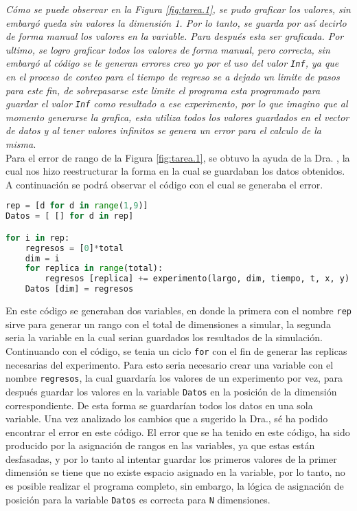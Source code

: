 \documentclass{article}
\begin{document}
\textit{Cómo se puede observar en la Figura \ref{fig:tarea.1}, se pudo graficar los valores, sin embargó queda sin valores la dimensión 1. Por lo tanto, se guarda por así decirlo de forma manual los valores en la variable. Para después esta ser graficada. Por ultimo, se logro graficar todos los valores de forma manual, pero correcta, sin embargó al código se le generan errores creo yo por el uso del valor \texttt{Inf}, ya que en el proceso de conteo para el tiempo de regreso se a dejado un limite de pasos para este fin, de sobrepasarse este limite el programa esta programado para guardar el valor \texttt{Inf} como resultado a ese experimento, por lo que imagino que al momento generarse la grafica, esta utiliza todos los valores guardados en el vector de datos y al tener valores infinitos se genera un error para el calculo de la misma.}\\

Para el error de rango de la Figura \ref{fig:tarea.1}, se obtuvo la ayuda de la Dra. \citet{DRA.CONV}, la cual nos hizo reestructurar la forma en la cual se guardaban los datos obtenidos. A continuación se podrá observar el código con el cual se generaba el error.

\begin{lstlisting}[language=Python]
rep = [d for d in range(1,9)]     
Datos = [ [] for d in rep]

for i in rep:
    regresos = [0]*total        
    dim = i
    for replica in range(total):
        regresos [replica] += experimento(largo, dim, tiempo, t, x, y)
    Datos [dim] = regresos
\end{lstlisting}

En este código se generaban dos variables, en donde la primera con el nombre \texttt{rep} sirve para generar un rango con el total de dimensiones a simular, la segunda seria la variable en la cual serian guardados los resultados de la simulación. Continuando con el código, se tenia un ciclo \texttt{for} con el fin de generar las replicas necesarias del experimento. Para esto seria necesario crear una variable con el nombre \texttt{regresos}, la cual guardaría los valores de un experimento por vez, para después guardar los valores en la variable \texttt{Datos} en la posición de la dimensión correspondiente. De esta forma se guardarían todos los datos en una sola variable.  Una vez analizado los cambios que a sugerido la Dra.\citet{DRA.CONV}, sé ha podido encontrar el error en este código. El error que se ha tenido en este código, ha sido producido por la asignación  de rangos en las variables, ya que estas están desfasadas, y por lo tanto al intentar guardar los primeros valores de la primer dimensión se tiene que no existe espacio asignado en la variable, por lo tanto, no es posible realizar el programa completo, sin embargo,  la lógica de asignación de posición para la variable \texttt{Datos} es correcta para \texttt{N} dimensiones.\\
\end{document}

